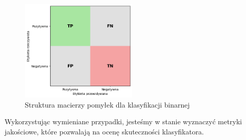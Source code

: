 \documentclass[a4paper,twoside,12pt]{book}
\begin{document}
\begin{figure}[!h]
	\centering
	\includegraphics[width=0.5\textwidth]{img/r3/error_matrix.png}
	\caption{Struktura macierzy pomyłek dla klasyfikacji binarnej}
	\label{fig:etykieta-rysunku}
\end{figure}

Wykorzystując wymieniane przypadki, jesteśmy w stanie wyznaczyć metryki jakościowe, które pozwalają na ocenę skuteczności klasyfikatora.
\end{document}
